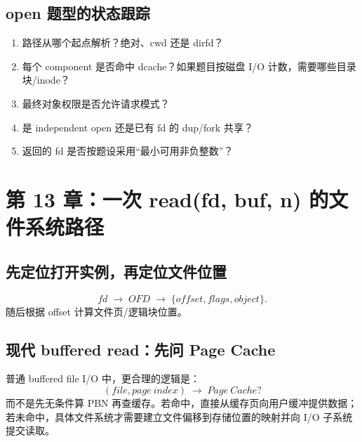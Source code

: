 \documentclass[11pt,a4paper]{ctexart}
\newcommand{\arr}{\;\longrightarrow\;}
\begin{document}
\begin{center}
\end{center}

\subsection{open 题型的状态跟踪}
\begin{enumerate}
  \item 路径从哪个起点解析？绝对、cwd 还是 dirfd？
  \item 每个 component 是否命中 dcache？如果题目按磁盘 I/O 计数，需要哪些目录块/inode？
  \item 最终对象权限是否允许请求模式？
  \item 是 independent open 还是已有 fd 的 dup/fork 共享？
  \item 返回的 fd 是否按题设采用“最小可用非负整数”？
\end{enumerate}

\section{第 13 章：一次 read(fd, buf, n) 的文件系统路径}

\subsection{先定位打开实例，再定位文件位置}
\[
fd\arr OFD\arr\{offset,flags,object\}.
\]
随后根据 offset 计算文件页/逻辑块位置。

\subsection{现代 buffered read：先问 Page Cache}
普通 buffered file I/O 中，更合理的逻辑是：
\[
\boxed{(file,page\ index)\arr Page\ Cache?}
\]
而不是先无条件算 PBN 再查缓存。若命中，直接从缓存页向用户缓冲提供数据；若未命中，具体文件系统才需要建立文件偏移到存储位置的映射并向 I/O 子系统提交读取。
\end{document}
